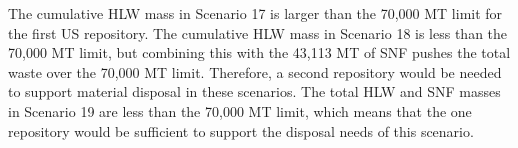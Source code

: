 The cumulative \gls{HLW} mass in Scenario 17 is larger than the 70,000
MT limit for the first US repository. The cumulative \gls{HLW} mass 
in Scenario 18 is less than the 70,000 MT limit, but combining this with 
the 43,113 MT of \gls{SNF} pushes the total waste over the 70,000 MT 
limit. Therefore, a second repository would be needed to support 
material disposal in these scenarios. The total \gls{HLW} and \gls{SNF} 
masses in Scenario 19 are less than the 70,000 MT limit, which means 
that the one repository would be sufficient to support the disposal 
needs of this scenario. 
